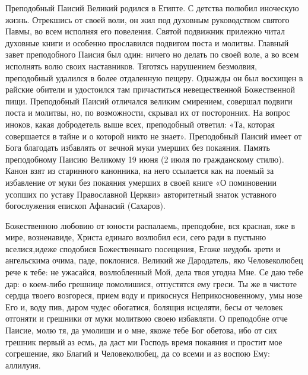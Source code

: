 

\label{_text903.htm}



Преподобный Паисий Великий родился в Египте. С детства полюбил иноческую жизнь. Отрекшись от своей воли, он жил под духовным руководством святого Павмы, во всем исполняя его повеления. Святой подвижник прилежно читал духовные книги и особенно прославился подвигом поста и молитвы. Главный завет преподобного Паисия был один:
ничего но делать по своей воле, а во всем исполнять волю своих наставников. Тяготясь нарушением безмолвия, преподобный удалился в более отдаленную пещеру. Однажды он был восхищен в райские обители и удостоился там причаститься невещественной Божественной пищи. Преподобный Паисий отличался великим смирением, совершал подвиги поста и молитвы, но, по возможности, скрывал их от посторонних. На вопрос иноков, какая добродетель выше всех, преподобный ответил: «Та, которая совершается в тайне и о которой никто не знает». Преподобный Паисий
имеет от Бога благодать избавлять от вечной муки умерших без покаяния. Память преподобному Паисию Великому 19 июня (2 июля по гражданскому стилю). Канон взят из старинного канонника, на него ссылается как на поемый за избавление от муки без покаяния умерших в своей книге «О поминовении усопших по уставу Православной Церкви» авторитетный знаток уставного богослужения епископ Афанасий (Сахаров).


\medskip



Божественною любовию от юности распалаемь, преподобне, вся красная, яже в мире, возненавиде, Христа единаго возлюбил еси, сего ради в пустыню вселися,идеже сподобися Божественнаго посещения, Егоже неудобь зрети и ангельскима очима, паде, поклонися. Великий же Дародатель, яко Человеколюбец рече к тебе: не ужасайся, возлюбленный Мой, дела твоя угодна Мне. Се даю тебе дар: о коем-либо грешнице помолишися, отпустятся ему греси. Ты же в чистоте сердца твоего возгореся, прием воду и прикоснуся Неприкосновенному, умы нозе Его и, воду пив, даром чудес обогатися, болящия исцеляти, бесы от человек отгоняти и грешники от муки молитвою своею избавляти. О преподобне отче Паисие, молю тя, да умолиши и о мне, якоже тебе Бог обетова, ибо от сих грешник первый аз есмь, да даст ми Господь время покаяния и простит мое согрешение, яко Благий и Человеколюбец, да со всеми и аз воспою Ему: аллилуия. 


